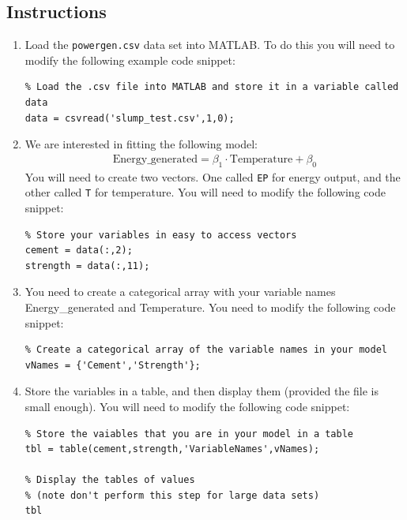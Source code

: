 \documentclass[12pt]{article}
\begin{document}
\subsection*{Instructions}
\begin{enumerate}
\item Load the \verb|powergen.csv| data set into MATLAB. To do this you will need to modify the following example code snippet:
\vspace{-0.4cm}
\begin{lstlisting}
% Load the .csv file into MATLAB and store it in a variable called data
data = csvread('slump_test.csv',1,0);
\end{lstlisting}

\item We are interested in fitting the following model:
\begin{align*}
\textrm{Energy\_generated} = \beta_1 \cdot \textrm{Temperature} + \beta_0
\end{align*}
You will need to create two vectors. One called \verb|EP| for energy output, and the other called \verb|T| for temperature. You will need to modify the following code snippet:
\vspace{-0.4cm}
\begin{lstlisting}
% Store your variables in easy to access vectors
cement = data(:,2);
strength = data(:,11);
\end{lstlisting}
\newpage
\item You need to create a categorical array with your variable names Energy\_generated and Temperature. You need to modify the following code snippet:
\vspace{-0.4cm}
\begin{lstlisting}
% Create a categorical array of the variable names in your model
vNames = {'Cement','Strength'};
\end{lstlisting}

\item Store the variables in a table, and then display them (provided the file is small enough). You will need to modify the following code snippet:
\vspace{-0.4cm}
\begin{lstlisting}
% Store the vaiables that you are in your model in a table
tbl = table(cement,strength,'VariableNames',vNames);

% Display the tables of values
% (note don't perform this step for large data sets)
tbl
\end{lstlisting}


\end{enumerate}
\end{document}
